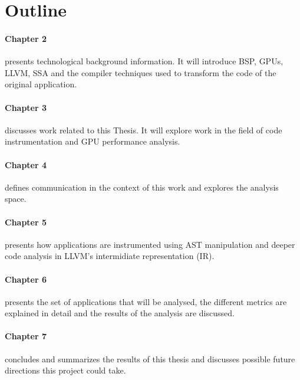 \section{Outline}
	\paragraph{Chapter 2} presents technological background information. It will introduce BSP, GPUs, LLVM, SSA and the compiler techniques used to transform the code of the original application.
	\paragraph{Chapter 3} discusses work related to this Thesis. It will explore work in the field of code instrumentation and GPU performance analysis.
	\paragraph{Chapter 4} defines communication in the context of this work and explores the analysis space.
	\paragraph{Chapter 5} presents how applications are instrumented using AST manipulation and deeper code analysis in LLVM's intermidiate representation (IR).
	\paragraph{Chapter 6} presents the set of applications that will be analysed, the different metrics are explained in detail and the results of the analysis are discussed.
	\paragraph{Chapter 7} concludes and summarizes the results of this thesis and discusses possible future directions this project could take.
